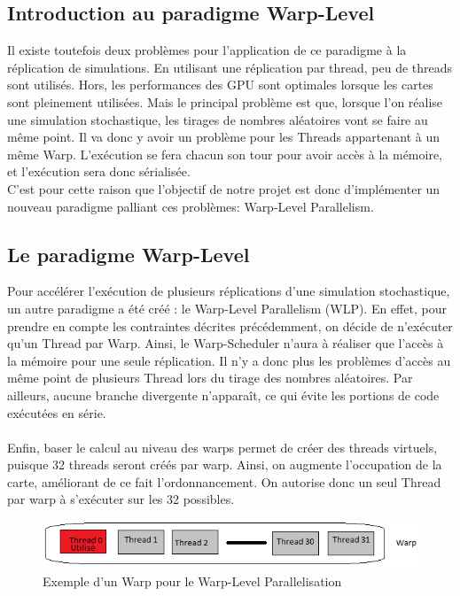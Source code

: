 \documentclass[a4paper,11pt]{report}
\begin{document}
{\subsection{Introduction au paradigme Warp-Level}
\vspace{6mm}
\normalsize{
Il existe toutefois deux problèmes pour l'application de ce paradigme à la réplication de simulations. En utilisant une réplication par thread, peu de threads sont utilisés. Hors, les performances des GPU sont optimales lorsque les cartes sont pleinement utilisées. Mais le principal problème est que, lorsque l'on réalise une simulation stochastique, les tirages de nombres aléatoires vont se faire au même point. Il va donc y avoir un problème pour les Threads appartenant à un même Warp. L'exécution se fera chacun son tour pour avoir accès à la mémoire, et l'exécution sera donc sérialisée. \\ 

C'est pour cette raison que l'objectif de notre projet est donc d'implémenter un nouveau paradigme palliant ces problèmes: Warp-Level Parallelism.\\
}

\subsection{Le paradigme Warp-Level}
\vspace{6mm}

\normalsize{
Pour accélérer l'exécution de plusieurs réplications d'une simulation stochastique, un autre paradigme a été créé : le Warp-Level Parallelism (WLP). En effet, pour prendre en compte les contraintes décrites précédemment, on décide de n'exécuter qu'un Thread par Warp. Ainsi, le Warp-Scheduler n'aura à réaliser que l'accès à la mémoire pour une seule réplication. Il n'y a donc plus les problèmes d'accès au même point de plusieurs Thread lors du tirage des nombres aléatoires. Par ailleurs, aucune branche divergente n'apparaît, ce qui évite les portions de code exécutées en série. \\ \\

Enfin, baser le calcul au niveau des warps permet de créer des threads virtuels, puisque 32 threads seront créés par warp. Ainsi, on augmente l'occupation de la carte, améliorant de ce fait l'ordonnancement. On autorise donc un seul Thread par warp à s'exécuter sur les 32 possibles.
}
\begin{figure}[h]
   \begin{center}
   \includegraphics[scale = 0.9]{warp.png}
   \end{center}
  \caption{Exemple d'un Warp pour le Warp-Level Parallelisation}
  \label{warp_example}
\end{figure}

}
\end{document}
